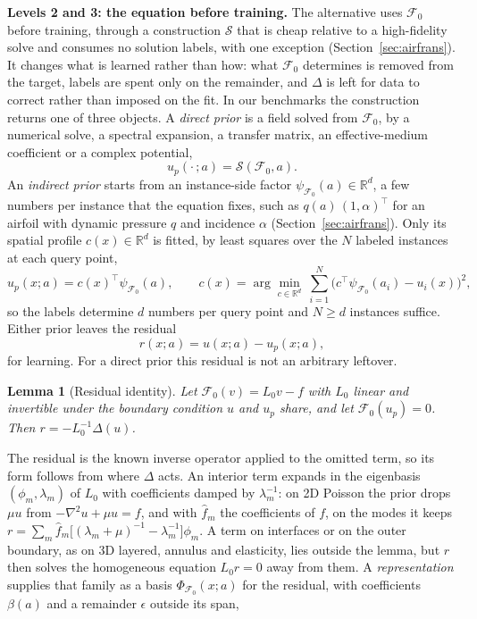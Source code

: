 \documentclass{article}
\newtheorem{lemma}{Lemma}
\begin{document}
\textbf{Levels 2 and 3: the equation before training.}
The alternative uses $\mathcal{F}_0$ before training, through a construction $\mathcal{S}$ that is cheap relative to a high-fidelity solve and consumes no solution labels, with one exception (Section~\ref{sec:airfrans}). It changes what is learned rather than how: what $\mathcal{F}_0$ determines is removed from the target, labels are spent only on the remainder, and $\Delta$ is left for data to correct rather than imposed on the fit. In our benchmarks the construction returns one of three objects. A \emph{direct prior} is a field solved from $\mathcal{F}_0$, by a numerical solve, a spectral expansion, a transfer matrix, an effective-medium coefficient or a complex potential,
\begin{equation}
u_p(\cdot\,;a)=\mathcal{S}(\mathcal{F}_0,a).
\label{eq:prior-solve}
\end{equation}
An \emph{indirect prior} starts from an instance-side factor $\psi_{\mathcal{F}_0}(a)\in\mathbb{R}^d$, a few numbers per instance that the equation fixes, such as $q(a)\,(1,\alpha)^{\!\top}$ for an airfoil with dynamic pressure $q$ and incidence $\alpha$ (Section~\ref{sec:airfrans}). Only its spatial profile $c(x)\in\mathbb{R}^d$ is fitted, by least squares over the $N$ labeled instances at each query point,
\begin{equation}
u_p(x;a)=c(x)^{\!\top}\psi_{\mathcal{F}_0}(a),
\qquad
c(x)=\arg\min_{c\in\mathbb{R}^d}\ \sum_{i=1}^{N}\bigl(c^{\!\top}\psi_{\mathcal{F}_0}(a_i)-u_i(x)\bigr)^{2},
\label{eq:prior_ls}
\end{equation}
so the labels determine $d$ numbers per query point and $N\ge d$ instances suffice. Either prior leaves the residual
\begin{equation}
r(x;a)=u(x;a)-u_p(x;a),
\label{eq:decomp}
\end{equation}
for learning. For a direct prior this residual is not an arbitrary leftover.
\begin{lemma}[Residual identity]
\label{lem:residual-identity}
Let $\mathcal{F}_0(v)=L_0v-f$ with $L_0$ linear and invertible under the boundary condition $u$ and $u_p$ share, and let $\mathcal{F}_0(u_p)=0$. Then $r=-L_0^{-1}\Delta(u)$.
\end{lemma}
The residual is the known inverse operator applied to the omitted term, so its form follows from where $\Delta$ acts. An interior term expands in the eigenbasis $(\phi_m,\lambda_m)$ of $L_0$ with coefficients damped by $\lambda_m^{-1}$: on 2D Poisson the prior drops $\mu u$ from $-\nabla^2u+\mu u=f$, and with $\hat f_m$ the coefficients of $f$, on the modes it keeps $r=\sum_m\hat f_m\bigl[(\lambda_m+\mu)^{-1}-\lambda_m^{-1}\bigr]\phi_m$. A term on interfaces or on the outer boundary, as on 3D layered, annulus and elasticity, lies outside the lemma, but $r$ then solves the homogeneous equation $L_0r=0$ away from them. A \emph{representation} supplies that family as a basis $\Phi_{\mathcal{F}_0}(x;a)$ for the residual, with coefficients $\beta(a)$ and a remainder $\epsilon$ outside its span,
\end{document}
